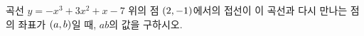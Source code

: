 곡선 $y=-x^3+3x^2+x-7$ 위의 점 $(2{,}\mkern3mu\mathopen{}-1)$에서의 접선이 이 곡선과 다시 만나는 점의 좌표가 $(a{,}\mkern3mu\mathopen{}b)$일 때, $ab$의 값을 구하시오.
